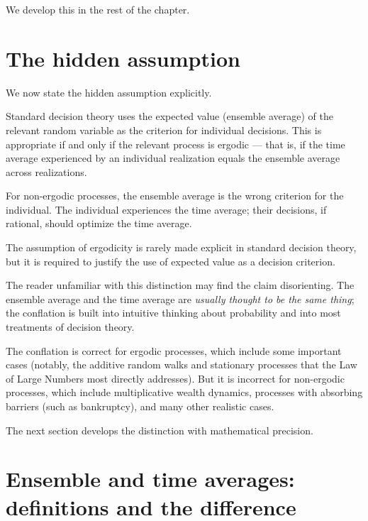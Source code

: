 We develop this in the rest of the chapter.

\section{The hidden assumption}
\label{sec:hidden-assumption}

We now state the hidden assumption explicitly.

\begin{conceptbox}
\label{conc:hidden-assumption}
Standard decision theory uses the expected value (ensemble average)
of the relevant random variable as the criterion for individual
decisions. This is appropriate if and only if the relevant process
is ergodic --- that is, if the time average experienced by an
individual realization equals the ensemble average across
realizations.

For non-ergodic processes, the ensemble average is the wrong
criterion for the individual. The individual experiences the time
average; their decisions, if rational, should optimize the time
average.

The assumption of ergodicity is rarely made explicit in standard
decision theory, but it is required to justify the use of expected
value as a decision criterion.
\end{conceptbox}

The reader unfamiliar with this distinction may find the claim
disorienting. The ensemble average and the time average are
\emph{usually thought to be the same thing}; the conflation is
built into intuitive thinking about probability and into most
treatments of decision theory.

The conflation is correct for ergodic processes, which include some
important cases (notably, the additive random walks and stationary
processes that the Law of Large Numbers most directly addresses).
But it is incorrect for non-ergodic processes, which include
multiplicative wealth dynamics, processes with absorbing barriers
(such as bankruptcy), and many other realistic cases.

The next section develops the distinction with mathematical
precision.

\section{Ensemble and time averages: definitions and the difference}
\label{sec:ensemble-time}

